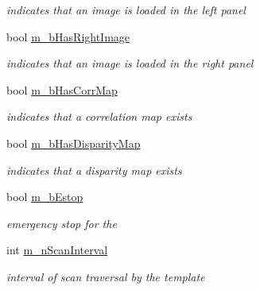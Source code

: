 \begin{DoxyCompactItemize}
\begin{DoxyCompactList}\small\item\em indicates that an image is loaded in the left panel \item\end{DoxyCompactList}\item 
\hypertarget{classQcorr_aa4afa1daa72ecf6caae74f6ced4ec251}{
bool \hyperlink{classQcorr_aa4afa1daa72ecf6caae74f6ced4ec251}{m\_\-bHasRightImage}}
\label{classQcorr_aa4afa1daa72ecf6caae74f6ced4ec251}

\begin{DoxyCompactList}\small\item\em indicates that an image is loaded in the right panel \item\end{DoxyCompactList}\item 
\hypertarget{classQcorr_a40e40bfd5cc79d8abf6e7b41465f440e}{
bool \hyperlink{classQcorr_a40e40bfd5cc79d8abf6e7b41465f440e}{m\_\-bHasCorrMap}}
\label{classQcorr_a40e40bfd5cc79d8abf6e7b41465f440e}

\begin{DoxyCompactList}\small\item\em indicates that a correlation map exists \item\end{DoxyCompactList}\item 
\hypertarget{classQcorr_a42ef5dadd6c1ff9f560de8cb1f43c2c6}{
bool \hyperlink{classQcorr_a42ef5dadd6c1ff9f560de8cb1f43c2c6}{m\_\-bHasDisparityMap}}
\label{classQcorr_a42ef5dadd6c1ff9f560de8cb1f43c2c6}

\begin{DoxyCompactList}\small\item\em indicates that a disparity map exists \item\end{DoxyCompactList}\item 
\hypertarget{classQcorr_adb31096514465f8c4a1993345d98f1eb}{
bool \hyperlink{classQcorr_adb31096514465f8c4a1993345d98f1eb}{m\_\-bEstop}}
\label{classQcorr_adb31096514465f8c4a1993345d98f1eb}

\begin{DoxyCompactList}\small\item\em emergency stop for the \item\end{DoxyCompactList}\item 
\hypertarget{classQcorr_ab07379fbbd7be906023eb5ec4d555931}{
int \hyperlink{classQcorr_ab07379fbbd7be906023eb5ec4d555931}{m\_\-nScanInterval}}
\label{classQcorr_ab07379fbbd7be906023eb5ec4d555931}

\begin{DoxyCompactList}\small\item\em interval of scan traversal by the template \item\end{DoxyCompactList}\end{DoxyCompactItemize}
